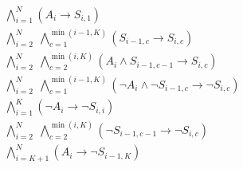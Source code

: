 \documentclass[letterpaper,journal]{IEEEtran}
\begin{document}
\begin{align}
    & \bigwedge_{i=1}^{N} \left( A_i \rightarrow S_{i,1} \right) \label{eq:nsc_1} \\
    & \bigwedge_{i=2}^{N} \;\bigwedge_{c=1}^{\min(i-1,K)} \left( S_{i-1,c} \rightarrow S_{i,c} \right) \label{eq:nsc_2} \\
    & \bigwedge_{i=2}^{N} \;\bigwedge_{c=2}^{\min(i,K)} \left( A_i \land S_{i-1,c-1} \rightarrow S_{i,c} \right) \label{eq:nsc_3} \\
    & \bigwedge_{i=2}^{N} \;\bigwedge_{c=1}^{\min(i-1,K)} \left( \neg A_i \land \neg S_{i-1,c} \rightarrow \neg S_{i,c} \right) \label{eq:nsc_4} \\
    & \bigwedge_{i=1}^{K} \left( \neg A_i \rightarrow \neg S_{i,i} \right) \label{eq:nsc_5} \\
    & \bigwedge_{i=2}^{N} \;\bigwedge_{c=2}^{\min(i,K)} \left( \neg S_{i-1,c-1} \rightarrow \neg S_{i,c} \right) \label{eq:nsc_6} \\
    & \bigwedge_{i=K+1}^{N} \left( A_i \rightarrow \neg S_{i-1,K} \right) \label{eq:nsc_7}
\end{align}
\end{document}
